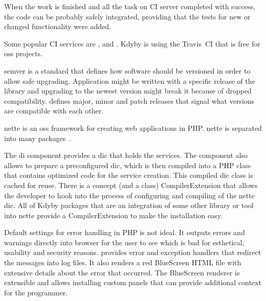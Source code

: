 When the work is finished and all the task on CI server completed with success, the code can be probably safely integrated, providing that the tests for new or changed functionality were added.

Some popular CI services are ,  and . Kdyby is using the Travis~CI that is free for \gls{oss} projects.

 \label{sec:theory:semver}

\gls{semver} is a standard that defines how software should be versioned in order to allow safe upgrading. Application might be written with a specific release of the library and upgrading to the newest version might break it because of dropped compatibility.  defines major, minor and patch releases that signal what versions are compatible with each other.

 \label{sec:theory:nette}

\gls{nette} is an \gls{oss} framework for creating web applications in PHP. \gls{nette} is separated into many packages~\cite{nette:introduction}.

The \gls{di} component  provides a \gls{dic} that holds the services. The component also allows to prepare a preconfigured \gls{dic}, which is then compiled into a PHP class that contains optimized code for the service creation. This compiled \gls{dic} class is cached for reuse. There is a concept (and a class) CompilerExtension that allows the developer to hook into the process of configuring and compiling of the \gls{nette} \gls{dic}. All of Kdyby packages that are an integration of some other library or tool into \gls{nette} provide a CompilerExtension to make the installation easy.

Default settings for error handling in PHP is not ideal. It outputs errors and warnings directly into browser for the user to see which is bad for esthetical, usability and security reasons.  provides error and exception handlers that redirect the messages into log files. It also renders a red BlueScreen HTML file with extensive details about the error that occurred. The BlueScreen renderer is extensible and allows installing custom panels that can provide additional context for the programmer.

